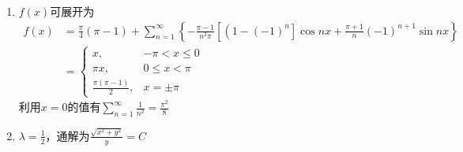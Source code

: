 \begin{enumerate}
\begin{enumerate}
	\item
	$ f(x) $可展开为
\[ 
	\begin{aligned}
	f(x)&=\frac{\pi}{4}(\pi-1)+\sum\limits_{n=1}^{\infty}\left\{-\frac{\pi-1}{n^{2} \pi}\left[\left(1-(-1)^{n}\right] \cos n x+\frac{\pi+1}{n}(-1)^{n+1} \sin n x\right\}\right. \\
	&=\left\{\begin{array}{ll}x, & -\pi<x \leqslant 0 \\ \pi x, & 0 \leqslant x<\pi \\ \frac{\pi(\pi-1)}{2},  & x=\pm \pi\end{array}\right.
\end{aligned}
 \]
利用$ x=0 $的值有$\sum\limits_{n=1}^{\infty} \frac{1}{n^{2}}=\frac{\pi^{2}}{8}$	
	
\item 
$ \lambda= \frac{ 1 }{ 2 }  $，通解为$ \frac{\sqrt{x^{2}+y^{2}}}{y} =C $
\end{enumerate}


	
\end{enumerate}



